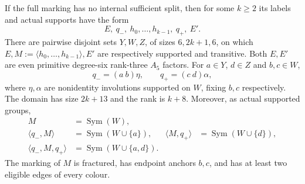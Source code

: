 \documentclass[11pt,a4paper]{article}
\newcommand{\gen}[1]{\langle#1\rangle}
\newcommand{\Sym}{\operatorname{Sym}}
\begin{document}
\begin{theorem}\label{ends}
If the full marking has no internal sufficient split, then for
some $k\ge2$ its labels and actual supports have the form
\[
                       E,\ q_-,\ h_0,\ldots,h_{k-1},\ q_+,\ E'.
                                                               \tag{2}
\]
There are pairwise disjoint sets $Y,W,Z$, of sizes $6,2k+1,6$,
on which $E,M:=\gen{h_0,\ldots,h_{k-1}},E'$ are respectively
supported and transitive. Both $E,E'$ are even primitive
degree-six rank-three $A_5$ factors. For $a\in Y$, $d\in Z$
and $b,c\in W$,
\[
 q_-=(a\ b)\eta,\qquad q_+=(c\ d)\alpha,
                                                               \tag{3}
\]
where $\eta,\alpha$ are nonidentity involutions supported on
$W$, fixing $b,c$ respectively. The domain has size $2k+13$
and the rank is $k+8$. Moreover, as actual supported groups,
\[
\begin{aligned}
 M&=\Sym(W),\\
 \gen{q_-,M}&=\Sym(W\cup\{a\}),&
 \gen{M,q_+}&=\Sym(W\cup\{d\}),\\
 \gen{q_-,M,q_+}&=\Sym(W\cup\{a,d\}).
\end{aligned}                                                  \tag{4}
\]
The marking of $M$ is fractured, has endpoint anchors $b,c$,
and has at least two eligible edges of every colour.
\end{theorem}
\end{document}
